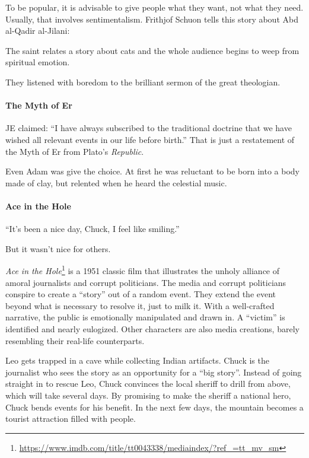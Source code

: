 To be popular, it is advisable to give people what they want, not what they need. Usually, that involves sentimentalism. Frithjof Schuon tells this story about Abd al-Qadir al-Jilani:

\begin{quotex}
The saint relates a story about cats and the whole audience begins to weep from spiritual emotion.

They listened with boredom to the brilliant sermon of the great theologian.
\end{quotex}


\paragraph{The Myth of Er}


JE claimed: ``I have always subscribed to the traditional doctrine that we have wished all relevant events in our life before birth.'' That is just a restatement of the Myth of Er from Plato's \emph{Republic}.

Even Adam was give the choice. At first he was reluctant to be born into a body made of clay, but relented when he heard the celestial music.

\paragraph{Ace in the Hole}


``It's been a nice day, Chuck, I feel like smiling.''

But it wasn't nice for others. 

\emph{Ace in the Hole}\footnote{\url{https://www.imdb.com/title/tt0043338/mediaindex/?ref\_=tt\_mv\_sm}} is a 1951 classic film that illustrates the unholy alliance of amoral journalists and corrupt politicians. The media and corrupt politicians conspire to create a ``story'' out of a random event. They extend the event beyond what is necessary to resolve it, just to milk it. With a well-crafted narrative, the public is emotionally manipulated and drawn in. A ``victim'' is identified and nearly eulogized. Other characters are also media creations, barely resembling their real-life counterparts.

Leo gets trapped in a cave while collecting Indian artifacts. Chuck is the journalist who sees the story as an opportunity for a ``big story''. Instead of going straight in to rescue Leo, Chuck convinces the local sheriff to drill from above, which will take several days. By promising to make the sheriff a national hero, Chuck bends events for his benefit. In the next few days, the mountain becomes a tourist attraction filled with people.

